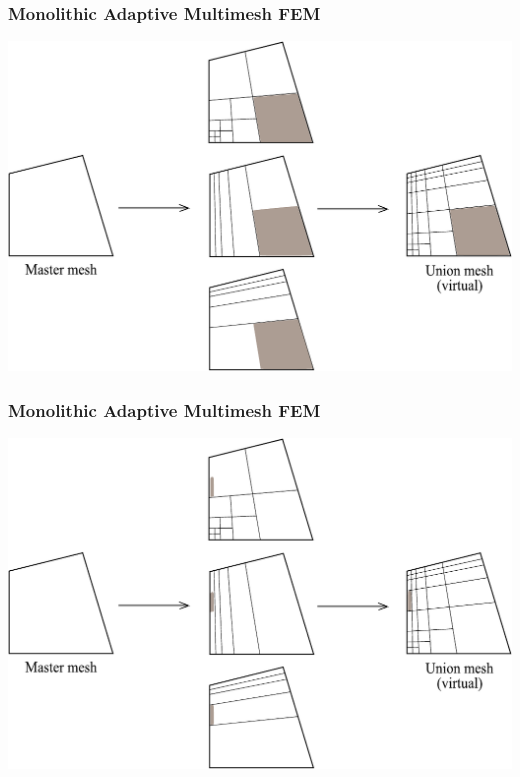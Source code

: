 \begin{frame}
  \frametitle{Monolithic Adaptive Multimesh FEM}
  \begin{center}
    \includegraphics[height=0.7\textheight]{multimesh/mm_14.pdf}
  \end{center}
\end{frame}

\begin{frame}
  \frametitle{Monolithic Adaptive Multimesh FEM}
  \begin{center}
    \includegraphics[height=0.7\textheight]{multimesh/mm_15.pdf}
  \end{center}
\end{frame}

